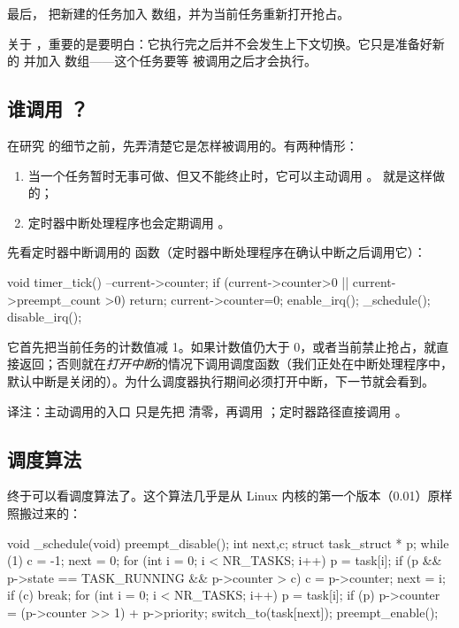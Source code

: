 最后， 把新建的任务加入  数组，并为当前任务重新打开抢占。

关于 ，重要的是要明白：它执行完之后并不会发生上下文切换。它只是准备好新的  并加入  数组——这个任务要等  被调用之后才会执行。

\subsection{谁调用 ？}

在研究  的细节之前，先弄清楚它是怎样被调用的。有两种情形：

\begin{enumerate}
  \item 当一个任务暂时无事可做、但又不能终止时，它可以主动调用 。 就是这样做的；
  \item 定时器中断处理程序也会定期调用 。
\end{enumerate}

先看定时器中断调用的  函数（定时器中断处理程序在确认中断之后调用它）：

\begin{ccode}
void timer_tick()
{
	--current->counter;
	if (current->counter>0 || current->preempt_count >0) {
		return;
	}
	current->counter=0;
	enable_irq();
	_schedule();
	disable_irq();
}
\end{ccode}

它首先把当前任务的计数值减 1。如果计数值仍大于 0，或者当前禁止抢占，就直接返回；否则就在\emph{打开中断}的情况下调用调度函数（我们正处在中断处理程序中，默认中断是关闭的）。为什么调度器执行期间必须打开中断，下一节就会看到。

\begin{remark}
  译注：主动调用的入口  只是先把  清零，再调用 ；定时器路径直接调用 。
\end{remark}

\subsection{调度算法}

终于可以看调度算法了。这个算法几乎是从 Linux 内核的第一个版本（0.01）原样照搬过来的：

\begin{ccode}
void _schedule(void)
{
	preempt_disable();
	int next,c;
	struct task_struct * p;
	while (1) {
		c = -1;
		next = 0;
		for (int i = 0; i < NR_TASKS; i++){
			p = task[i];
			if (p && p->state == TASK_RUNNING && p->counter > c) {
				c = p->counter;
				next = i;
			}
		}
		if (c) {
			break;
		}
		for (int i = 0; i < NR_TASKS; i++) {
			p = task[i];
			if (p) {
				p->counter = (p->counter >> 1) + p->priority;
			}
		}
	}
	switch_to(task[next]);
	preempt_enable();
}
\end{ccode}

